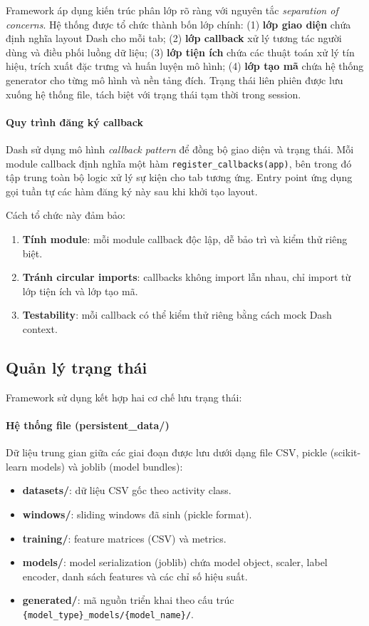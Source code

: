 Framework áp dụng kiến trúc phân lớp rõ ràng với nguyên tắc \textit{separation of concerns}. Hệ thống được tổ chức thành bốn lớp chính: (1) \textbf{lớp giao diện} chứa định nghĩa layout Dash cho mỗi tab; (2) \textbf{lớp callback} xử lý tương tác người dùng và điều phối luồng dữ liệu; (3) \textbf{lớp tiện ích} chứa các thuật toán xử lý tín hiệu, trích xuất đặc trưng và huấn luyện mô hình; (4) \textbf{lớp tạo mã} chứa hệ thống generator cho từng mô hình và nền tảng đích. Trạng thái liên phiên được lưu xuống hệ thống file, tách biệt với trạng thái tạm thời trong session.

\paragraph{Quy trình đăng ký callback}
Dash sử dụng mô hình \textit{callback pattern} để đồng bộ giao diện và trạng thái. Mỗi module callback định nghĩa một hàm \texttt{register\_callbacks(app)}, bên trong đó tập trung toàn bộ logic xử lý sự kiện cho tab tương ứng. Entry point ứng dụng gọi tuần tự các hàm đăng ký này sau khi khởi tạo layout.

Cách tổ chức này đảm bảo:
\begin{enumerate}
    \item \textbf{Tính module}: mỗi module callback độc lập, dễ bảo trì và kiểm thử riêng biệt.
    \item \textbf{Tránh circular imports}: callbacks không import lẫn nhau, chỉ import từ lớp tiện ích và lớp tạo mã.
    \item \textbf{Testability}: mỗi callback có thể kiểm thử riêng bằng cách mock Dash context.
\end{enumerate}

\subsection{Quản lý trạng thái}
\label{subsec:state_management}

Framework sử dụng kết hợp hai cơ chế lưu trạng thái:

\paragraph{Hệ thống file (persistent\_data/)}
Dữ liệu trung gian giữa các giai đoạn được lưu dưới dạng file CSV, pickle (scikit-learn models) và joblib (model bundles):
\begin{itemize}
    \item \textbf{datasets/}: dữ liệu CSV gốc theo activity class.
    \item \textbf{windows/}: sliding windows đã sinh (pickle format).
    \item \textbf{training/}: feature matrices (CSV) và metrics.
    \item \textbf{models/}: model serialization (joblib) chứa model object, scaler, label encoder, danh sách features và các chỉ số hiệu suất.
    \item \textbf{generated/}: mã nguồn triển khai theo cấu trúc \texttt{\{model\_type\}\_models/\{model\_name\}/}.
\end{itemize}

